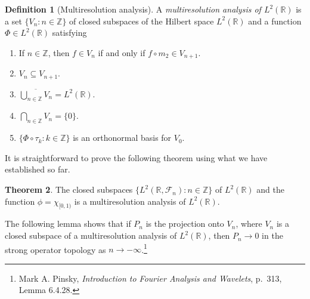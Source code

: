 \documentclass{article}
\theoremstyle{definition}
\newtheorem{theorem}{Theorem}
\theoremstyle{definition}
\newtheorem{definition}[theorem]{Definition}
\begin{document}
\begin{definition}[Multiresolution analysis]
A {\em multiresolution analysis of $L^2(\mathbb{R})$} is a set $\{V_n:n \in \mathbb{Z}\}$ of
closed subspaces of the Hilbert space $L^2(\mathbb{R})$ and a function $\Phi \in L^2(\mathbb{R})$ satisfying
\begin{enumerate}
\item If $n \in \mathbb{Z}$, then $f \in V_n$ if and only if $f \circ m_2 \in V_{n+1}$.
\item $V_n \subseteq V_{n+1}$.
\item $\overline{\bigcup_{n \in \mathbb{Z}} V_n}=  L^2(\mathbb{R})$.
\item $\bigcap_{n \in \mathbb{Z}} V_n=\{0\}$.
\item $\{\Phi \circ \tau_k : k \in \mathbb{Z}\}$ is an orthonormal basis for $V_0$.
\end{enumerate}
\label{MRAdef}
\end{definition}

It is straightforward to prove the following theorem using what we have established so far.


\begin{theorem}
The closed subspaces $\{L^2(\mathbb{R},\mathscr{F}_n):n \in \mathbb{Z}\}$ of $L^2(\mathbb{R})$ and the function $\phi=\chi_{[0,1)}$ is a multiresolution analysis
of $L^2(\mathbb{R})$.
\end{theorem}



The following lemma shows that if $P_n$ is the projection onto $V_n$, where $V_n$ is a closed subspace of a multiresolution analysis of $L^2(\mathbb{R})$, then
$P_n \to 0$ in the strong operator topology as $n \to -\infty$.\footnote{Mark A. Pinsky, 
 {\em Introduction to Fourier Analysis and Wavelets}, p.~313, Lemma 6.4.28.}
\end{document}

